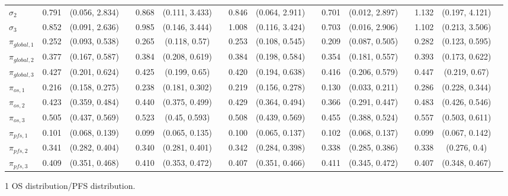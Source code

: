 \documentclass[AMA,STIX1COL]{WileyNJD-v2}
\begin{document}
\begin{landscape}
\begin{center}
\begin{table}[t]
\begin{tabular}{l c c c c c c c c c c c c c c c}
$\sigma_2$ & 0.791 & (0.056, 2.834) &  & 0.868 & (0.111, 3.433) &  & 0.846 & (0.064, 2.911) &  & 0.701 & (0.012, 2.897) &  & 1.132 & (0.197, 4.121) & \\
$\sigma_3$ & 0.852 & (0.091, 2.636) &  & 0.985 & (0.146, 3.444) &  & 1.008 & (0.116, 3.424) &  & 0.703 & (0.016, 2.906) &  & 1.102 & (0.213, 3.506) & \\
$\pi_{global, 1}$ & 0.252 & (0.093, 0.538) &  & 0.265 & (0.118, 0.57) &  & 0.253 & (0.108, 0.545) &  & 0.209 & (0.087, 0.505) &  & 0.282 & (0.123, 0.595) & \\
$\pi_{global, 2}$ & 0.377 & (0.167, 0.587) &  & 0.384 & (0.208, 0.619) &  & 0.384 & (0.198, 0.584) &  & 0.354 & (0.181, 0.557) &  & 0.393 & (0.173, 0.622) & \\
$\pi_{global, 3}$ & 0.427 & (0.201, 0.624) &  & 0.425 & (0.199, 0.65) &  & 0.420 & (0.194, 0.638) &  & 0.416 & (0.206, 0.579) &  & 0.447 & (0.219, 0.67) & \\
$\pi_{os, 1}$ & 0.216 & (0.158, 0.275) &  & 0.238 & (0.181, 0.302) &  & 0.219 & (0.156, 0.278) &  & 0.130 & (0.033, 0.211) &  & 0.286 & (0.228, 0.344) & \\
$\pi_{os, 2}$ & 0.423 & (0.359, 0.484) &  & 0.440 & (0.375, 0.499) &  & 0.429 & (0.364, 0.494) &  & 0.366 & (0.291, 0.447) &  & 0.483 & (0.426, 0.546) & \\
$\pi_{os, 3}$ & 0.505 & (0.437, 0.569) &  & 0.523 & (0.45, 0.593) &  & 0.508 & (0.439, 0.569) &  & 0.455 & (0.388, 0.524) &  & 0.557 & (0.503, 0.611) & \\
$\pi_{pfs, 1}$ & 0.101 & (0.068, 0.139) &  & 0.099 & (0.065, 0.135) &  & 0.100 & (0.065, 0.137) &  & 0.102 & (0.068, 0.137) &  & 0.099 & (0.067, 0.142) & \\
$\pi_{pfs, 2}$ & 0.341 & (0.282, 0.404) &  & 0.340 & (0.281, 0.401) &  & 0.342 & (0.284, 0.398) &  & 0.338 & (0.285, 0.386) &  & 0.338 & (0.276, 0.4) & \\
$\pi_{pfs, 3}$ & 0.409 & (0.351, 0.468) &  & 0.410 & (0.353, 0.472) &  & 0.407 & (0.351, 0.466) &  & 0.411 & (0.345, 0.472) &  & 0.407 & (0.348, 0.467) & \\
\bottomrule
\end{tabular}
\begin{tablenotes}%
\item[1] OS distribution/PFS distribution.
\end{tablenotes}
\end{table}
\end{center}
\end{landscape}
\end{document}
